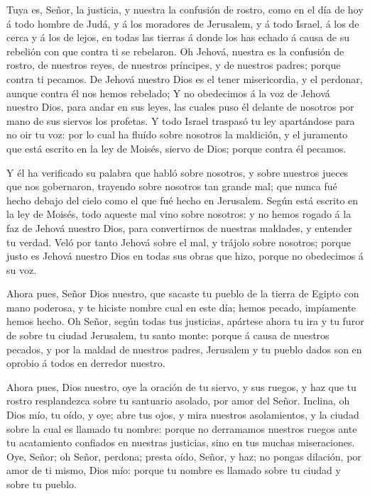  Tuya es, Señor, la justicia, y nuestra la confusión de
rostro, como en el día de hoy á todo hombre de Judá, y á los moradores
de Jerusalem, y á todo Israel, á los de cerca y á los de lejos, en todas
las tierras á donde los has echado á causa de su rebelión con que contra
ti se rebelaron.  Oh Jehová, nuestra es la confusión de
rostro, de nuestros reyes, de nuestros príncipes, y de nuestros padres;
porque contra ti pecamos.  De Jehová nuestro Dios es el
tener misericordia, y el perdonar, aunque contra él nos hemos rebelado;
 Y no obedecimos á la voz de Jehová nuestro Dios, para
andar en sus leyes, las cuales puso él delante de nosotros por mano de
sus siervos los profetas.  Y todo Israel traspasó tu ley
apartándose para no oir tu voz: por lo cual ha fluído sobre nosotros la
maldición, y el juramento que está escrito en la ley de Moisés, siervo
de Dios; porque contra él pecamos.

 Y él ha verificado su palabra que habló sobre nosotros, y
sobre nuestros jueces que nos gobernaron, trayendo sobre nosotros tan
grande mal; que nunca fué hecho debajo del cielo como el que fué hecho
en Jerusalem.  Según está escrito en la ley de Moisés, todo
aqueste mal vino sobre nosotros: y no hemos rogado á la faz de Jehová
nuestro Dios, para convertirnos de nuestras maldades, y entender tu
verdad.  Veló por tanto Jehová sobre el mal, y trájolo
sobre nosotros; porque justo es Jehová nuestro Dios en todas sus obras
que hizo, porque no obedecimos á su voz.

 Ahora pues, Señor Dios nuestro, que sacaste tu pueblo de
la tierra de Egipto con mano poderosa, y te hiciste nombre cual en este
día; hemos pecado, impíamente hemos hecho.  Oh Señor, según
todas tus justicias, apártese ahora tu ira y tu furor de sobre tu ciudad
Jerusalem, tu santo monte: porque á causa de nuestros pecados, y por la
maldad de nuestros padres, Jerusalem y tu pueblo dados son en oprobio á
todos en derredor nuestro.

 Ahora pues, Dios nuestro, oye la oración de tu siervo, y
sus ruegos, y haz que tu rostro resplandezca sobre tu santuario asolado,
por amor del Señor.  Inclina, oh Dios mío, tu oído, y oye;
abre tus ojos, y mira nuestros asolamientos, y la ciudad sobre la cual
es llamado tu nombre: porque no derramamos nuestros ruegos ante tu
acatamiento confiados en nuestras justicias, sino en tus muchas
miseraciones.  Oye, Señor; oh Señor, perdona; presta oído,
Señor, y haz; no pongas dilación, por amor de ti mismo, Dios mío: porque
tu nombre es llamado sobre tu ciudad y sobre tu pueblo.

